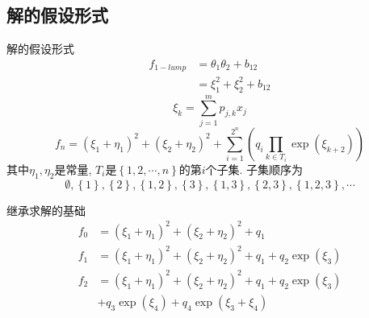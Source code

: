 \documentclass[handout]{beamer}
\newcommand{\sbrace}[1]{\left(#1\right)}
\newcommand{\bbrace}[1]{\left\{#1\right\}}
\begin{document}
\subsection{解的假设形式}
\begin{frame}{解的假设形式}
\begin{equation}
\begin{aligned}
f_{1-lump}&=\theta_1\theta_2+b_{12} \\
&=\xi_1^2+\xi_2^2+b_{12}
\end{aligned} 
\end{equation}
\begin{equation}
  \xi_k=\sum_{j=1}^m{p_{j,k}x_j}
\end{equation}
\begin{equation}
  f_{n}=\sbrace{\xi_1+\eta_1}^2+\sbrace{\xi_2+\eta_2}^2+\sum_{i=1}^{2^n}\sbrace {q_i\prod_{k \in T_i}{\exp(\xi_{k+2})}}
\end{equation}
其中$\eta_1,\eta_2$是常量, $T_i$是$\bbrace{1,2,\cdots,n}$的第$i$个子集. 子集顺序为
\[
    \emptyset,\bbrace{1},\bbrace{2},\bbrace{1,2},\bbrace{3},\bbrace{1,3},\bbrace{2,3},\bbrace{1,2,3},\cdots 
\]
\end{frame}

\begin{frame}{继承求解的基础}
\begin{equation}
\begin{aligned}
    f_0 &= \sbrace{\xi_1+\eta_1}^2+\sbrace{\xi_2+\eta_2}^2+q_1\\ 
    f_1 &= \sbrace{\xi_1+\eta_1}^2+\sbrace{\xi_2+\eta_2}^2+q_1+q_2 \exp(\xi_3) \\ 
    f_2 &= \sbrace{\xi_1+\eta_1}^2+\sbrace{\xi_2+\eta_2}^2+q_1+q_2 \exp(\xi_3) \\
        & +q_3 \exp(\xi_4) + q_4 \exp(\xi_3+\xi_4)
\end{aligned}
\end{equation}
\end{frame}
\end{document}
